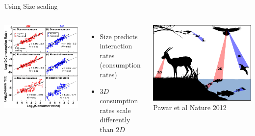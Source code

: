 \documentclass[xcolor={usenames,x11names},compress]{beamer}
\renewcommand{\(}{\begin{columns}}
\renewcommand{\)}{\end{columns}}
\newcommand{\<}[1]{\begin{column}{#1}}
\renewcommand{\>}{\end{column}}
\begin{document}
\begin{frame}{Using Size scaling}

\begin{columns}
  \centering
    \includegraphics[width=.9\textwidth]{DimRes1.pdf}
  \centering
    \begin{itemize}\setlength{\itemindent}{0em}
      \item Size predicts interaction rates (consumption rates)
      \item 3$D$ consumption rates scale differently than 2$D$
    \end{itemize}
    \vspace{6pt}
    \includegraphics[width=.9\textwidth]{Dimensionality.pdf}\\
    {\tiny Pawar et al Nature 2012}
\end{columns}

\end{frame}
\end{document}
